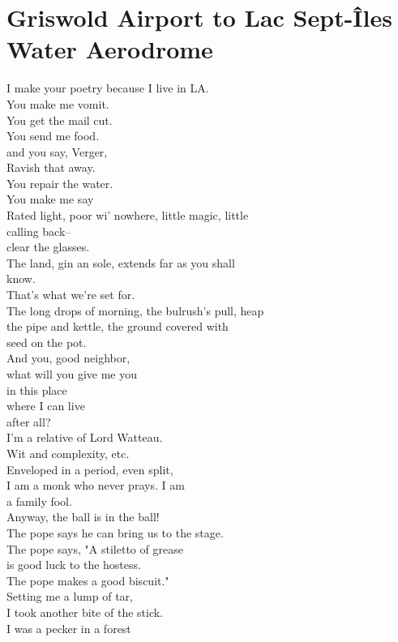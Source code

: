 \documentclass[smalldemyvopaper,11pt,twoside,onecolumn,openright,extrafontsizes]{memoir}
\newlength\drop
\begin{document}
\chapter{Griswold Airport to Lac Sept-Îles Water Aerodrome}
I make your poetry because I live in LA.
\\You make me vomit.
\\You get the mail cut.
\\You send me food.
\\and you say, Verger,
\\Ravish that away.
\\You repair the water.
\\You make me say
\\Rated light, poor wi' nowhere, little magic, little
\\calling back--
\\clear the glasses.
\\The land, gin an sole, extends far as you shall
\\know.
\\That's what we're set for.
\\The long drops of morning, the bulrush's pull, heap
\\the pipe and kettle, the ground covered with
\\seed on the pot.
\\And you, good neighbor,
\\what will you give me you
\\in this place
\\where I can live
\\after all?
\\I'm a relative of Lord Watteau.
\\Wit and complexity, etc.
\\Enveloped in a period, even split,
\\I am a monk who never prays. I am
\\a family fool.
\\Anyway, the ball is in the ball!
\\The pope says he can bring us to the stage.
\\The pope says, "A stiletto of grease
\\is good luck to the hostess.
\\The pope makes a good biscuit."
\\Setting me a lump of tar,
\\I took another bite of the stick.
\\I was a pecker in a forest
\end{document}
